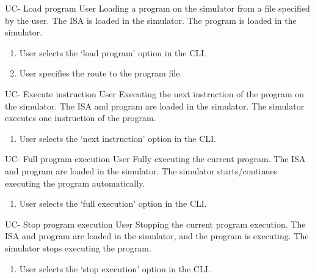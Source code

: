 \begin{useCase}{UC-}
  {Load program}  %
  {User}  %
  {Loading a program on the simulator from a file specified by the user.}  %
  {The \gls{ISA} is loaded in the simulator.}  %
  {The program is loaded in the simulator.}  %
  \begin{enumerate}[leftmargin=*, topsep=0pt, noitemsep]  %
    \item User selects the `load program' option in the \gls{CLI}.
    \item User specifies the route to the program file.
  \end{enumerate}
\end{useCase}

\begin{useCase}{UC-}
  {Execute instruction}  %
  {User}  %
  {Executing the next instruction of the program on the simulator.}  %
  {The \gls{ISA} and program are loaded in the simulator.}  %
  {The simulator executes one instruction of the program.}  %
  \begin{enumerate}[leftmargin=*, topsep=0pt, noitemsep]  %
    \item User selects the `next instruction' option in the \gls{CLI}.
  \end{enumerate}
\end{useCase}

\begin{useCase}{UC-}
  {Full program execution}  %
  {User}  %
  {Fully executing the current program.}  %
  {The \gls{ISA} and program are loaded in the simulator.}  %
  {The simulator starts/continues executing the program automatically.}  %
  \begin{enumerate}[leftmargin=*, topsep=0pt, noitemsep]  %
    \item User selects the `full execution' option in the \gls{CLI}.
  \end{enumerate}
\end{useCase}

\begin{useCase}{UC-}
  {Stop program execution}  %
  {User}  %
  {Stopping the current program execution.}  %
  {The \gls{ISA} and program are loaded in the simulator, and the program is executing.}  %
  {The simulator stops executing the program.}  %
  \begin{enumerate}[leftmargin=*, topsep=0pt, noitemsep]  %
    \item User selects the `stop execution' option in the \gls{CLI}.
  \end{enumerate}
\end{useCase}

